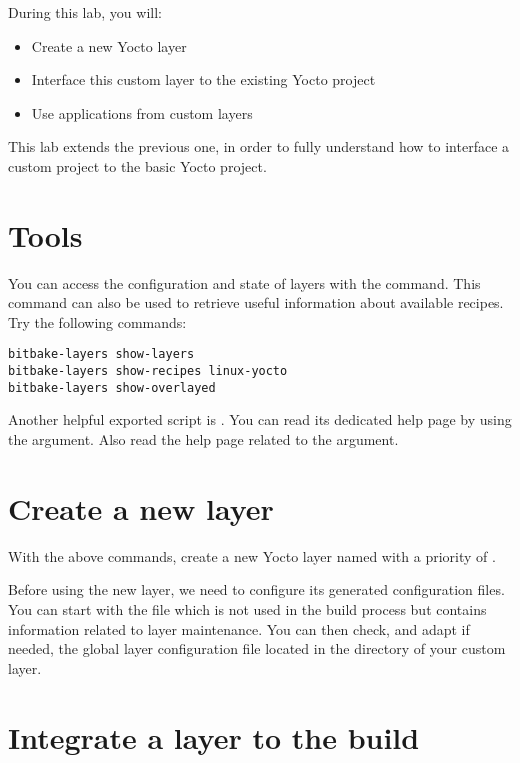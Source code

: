 
During this lab, you will:
\begin{itemize}
  \item Create a new Yocto layer
  \item Interface this custom layer to the existing Yocto project
  \item Use applications from custom layers
\end{itemize}

This lab extends the previous one, in order to fully understand how to interface
a custom project to the basic Yocto project.

\section{Tools}

You can access the configuration and state of layers with the
 command. This command can also be used to retrieve useful
information about available recipes. Try the following commands:
\begin{verbatim}
bitbake-layers show-layers
bitbake-layers show-recipes linux-yocto
bitbake-layers show-overlayed
\end{verbatim}

Another helpful exported script is . You can read its dedicated
help page by using the  argument. Also read the help page related to
the  argument.

\section{Create a new layer}

With the above commands, create a new Yocto layer named
 with a priority of .

Before using the new layer, we need to configure its generated configuration
files. You can start with the  file which is not used in the build
process but contains information related to layer maintenance. You can then
check, and adapt if needed, the global layer configuration file located in the
 directory of your custom layer.

\section{Integrate a layer to the build}

